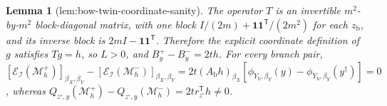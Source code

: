 \documentclass{article}
\newtheorem{lemma}{Lemma}
\begin{document}
\begin{lemma}[lem:bow-twin-coordinate-sanity]\label{lem:bow-twin-coordinate-sanity}
The operator \(T\) is an invertible \(m^2\)-by-\(m^2\) block-diagonal matrix, with one block \(I/(2m)+\mathbf 1\mathbf 1^{\mathsf T}/(2m^2)\) for each \(z_{\mathrm b}\), and its inverse block is \(2mI-\mathbf 1\mathbf 1^{\mathsf T}\). Therefore the explicit coordinate definition of \(g\) satisfies \(Tg=h\), so \(L>0\), and \(B_y^{+}-B_y^{-}=2th\). For every branch pair, \([\mathcal E_{\mathcal I}(\mathcal M_h^{+})]_{\beta_X,\beta_Y}-[\mathcal E_{\mathcal I}(\mathcal M_h^{-})]_{\beta_X,\beta_Y}=2t(A_{\mathrm b}h)_{\beta_X}[\phi_{Y_{\mathrm b},\beta_Y}(y)-\phi_{Y_{\mathrm b},\beta_Y}(y^{\dagger})]=0\), whereas \(Q_{z^{\circ},y}(\mathcal M_h^{+})-Q_{z^{\circ},y}(\mathcal M_h^{-})=2t r_{z^{\circ}}^{\mathsf T}h\ne0\).
\end{lemma}
\end{document}
